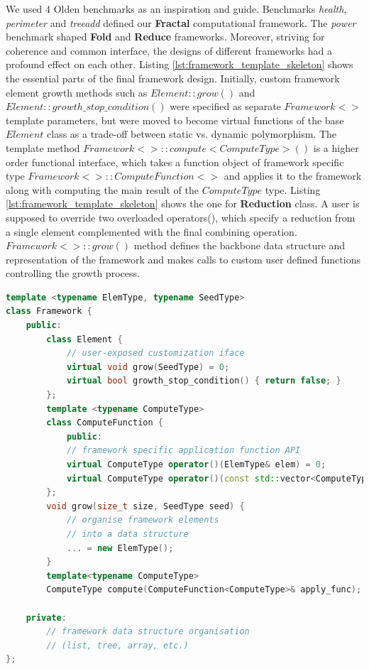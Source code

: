 \quad We used 4 Olden benchmarks as an inspiration and guide. Benchmarks \textit{health}, \textit{perimeter} and \textit{treeadd} defined our \textbf{Fractal} computational framework. The \textit{power} benchmark shaped \textbf{Fold} and \textbf{Reduce} frameworks. Moreover, striving for coherence and common interface, the designs of different frameworks had a profound effect on each other.\newline\null
\quad Listing \ref{lst:framework_template_skeleton} shows the essential parts of the final framework design. Initially, custom framework element growth methods such as $Element::grow()$ and $Element::growth\_stop\_condition()$ were specified as separate $Framework<>$ template parameters, but were moved to become virtual functions of the base $Element$ class as a trade-off between static vs. dynamic polymorphism. The template method $Framework<>::compute<ComputeType>()$ is a higher order functional interface, which takes a function object of framework specific type $Framework<>::ComputeFunction<>$ and applies it to the framework along with computing the main result of the $ComputeType$ type. Listing \ref{lst:framework_template_skeleton} shows the one for \textbf{Reduction} class. A user is supposed to override two overloaded operators(), which specify a reduction from a single element complemented with the final combining operation. $Framework<>::grow()$ method defines the backbone data structure and representation of the framework and makes calls to custom user defined functions controlling the growth process.

\begin{lstlisting}[caption={Computational framework class template skeleton},label={lst:framework_template_skeleton},language=C++]
template <typename ElemType, typename SeedType>
class Framework {
    public:
        class Element {
            // user-exposed customization iface
            virtual void grow(SeedType) = 0;
            virtual bool growth_stop_condition() { return false; }
        };
        template <typename ComputeType>
        class ComputeFunction {
            public:
            // framework specific application function API
            virtual ComputeType operator()(ElemType& elem) = 0;
            virtual ComputeType operator()(const std::vector<ComputeType>&) = 0;
        };
        void grow(size_t size, SeedType seed) {
            // organise framework elements 
            // into a data structure
            ... = new ElemType(); 
        }
        template<typename ComputeType>
        ComputeType compute(ComputeFunction<ComputeType>& apply_func);
    
    private:
        // framework data structure organisation
        // (list, tree, array, etc.)
};

\end{lstlisting}
